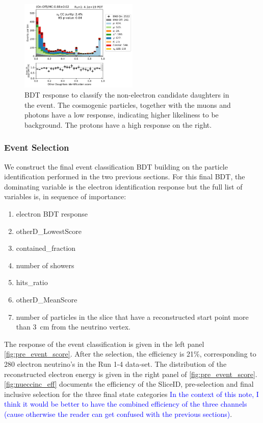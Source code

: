 \begin{figure}
    \centering
    \includegraphics[width=0.5\textwidth]{NueCCsel/Images/run1/pre_daughter_score.pdf}
    \caption{BDT response to classify the non-electron candidate daughters in the event. The cosmogenic particles, together with the muons and photons have a low response, indicating higher likeliness to be background. The protons have a high response on the right.}
    \label{fig:pre_daughter_score}
\end{figure}

\subsubsection{Event Selection}
We construct the final event classification BDT building on the particle identification performed in the two previous sections. For this final BDT, the dominating variable is the electron identification response but the full list of variables is, in sequence of importance:

\begin{enumerate}
    \item electron BDT response
    \item otherD\_LowestScore
    \item contained\_fraction
    \item number of showers
    \item hits\_ratio
    \item otherD\_MeanScore
    \item number of particles in the slice that have a reconstructed start point more than \SI{3}{\cm} from the neutrino vertex.
\end{enumerate}
The response of the event classification is given in the left panel \cref{fig:pre_event_score}. After the selection, the efficiency is 21\%, corresponding to 280 electron neutrino's in the Run 1-4 data-set. The distribution of the reconstructed electron energy is given in the right panel of \cref{fig:pre_event_score}. \cref{fig:nueccinc_eff} documents the efficiency of the SliceID, pre-selection and final inclusive selection for the three final state categories \textcolor{blue}{In the context of this note, I think it would be better to have the combined efficiency of the three channels (cause otherwise the reader can get confused with the previous sections)}.

